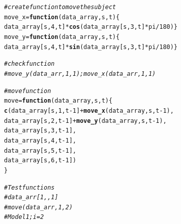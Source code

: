 \documentclass{article}\usepackage[]{graphicx}\usepackage[]{color}
\makeatletter
\newcommand{\hlnum}[1]{\textcolor[rgb]{0.686,0.059,0.569}{#1}}%
\newcommand{\hlcom}[1]{\textcolor[rgb]{0.678,0.584,0.686}{\textit{#1}}}%
\newcommand{\hlopt}[1]{\textcolor[rgb]{0,0,0}{#1}}%
\newcommand{\hlstd}[1]{\textcolor[rgb]{0.345,0.345,0.345}{#1}}%
\newcommand{\hlkwa}[1]{\textcolor[rgb]{0.161,0.373,0.58}{\textbf{#1}}}%
\newcommand{\hlkwb}[1]{\textcolor[rgb]{0.69,0.353,0.396}{#1}}%
\newcommand{\hlkwc}[1]{\textcolor[rgb]{0.333,0.667,0.333}{#1}}%
\newcommand{\hlkwd}[1]{\textcolor[rgb]{0.737,0.353,0.396}{\textbf{#1}}}%
\newenvironment{kframe}{%
 \def\at@end@of@kframe{}%
 \ifinner\ifhmode%
  \def\at@end@of@kframe{\end{minipage}}%
  \begin{minipage}{\columnwidth}%
 \fi\fi%
 \def\FrameCommand##1{\hskip\@totalleftmargin \hskip-\fboxsep
 \colorbox{shadecolor}{##1}\hskip-\fboxsep
     \hskip-\linewidth \hskip-\@totalleftmargin \hskip\columnwidth}%
 \MakeFramed {\advance\hsize-\width
   \@totalleftmargin\z@ \linewidth\hsize
   \@setminipage}}%
 {\par\unskip\endMakeFramed%
 \at@end@of@kframe}
\newenvironment{knitrout}{}{} %
\makeatother
\begin{document}
\begin{knitrout}
\color{fgcolor}\begin{kframe}
\begin{alltt}
\hlcom{#create function to move the subject}
\hlstd{move_x} \hlkwb{=} \hlkwa{function}\hlstd{(}\hlkwc{data_array}\hlstd{,} \hlkwc{s}\hlstd{,} \hlkwc{t}\hlstd{)\{}
\hlstd{data_array[s,} \hlnum{4}\hlstd{, t]} \hlopt{*} \hlkwd{cos}\hlstd{(data_array[s,}\hlnum{3}\hlstd{, t]}\hlopt{*}\hlstd{pi}\hlopt{/}\hlnum{180}\hlstd{)\}}
\hlstd{move_y} \hlkwb{=} \hlkwa{function}\hlstd{(}\hlkwc{data_array}\hlstd{,} \hlkwc{s}\hlstd{,} \hlkwc{t}\hlstd{)\{}
\hlstd{data_array[s,} \hlnum{4}\hlstd{, t]} \hlopt{*} \hlkwd{sin}\hlstd{(data_array[s,}\hlnum{3}\hlstd{, t]}\hlopt{*}\hlstd{pi}\hlopt{/}\hlnum{180}\hlstd{)\}}

\hlcom{# check function }
\hlcom{# move_y(data_arr, 1, 1); move_x(data_arr, 1,1)}

\hlcom{# move function}
\hlstd{move} \hlkwb{=} \hlkwa{function}\hlstd{(}\hlkwc{data_array}\hlstd{,} \hlkwc{s}\hlstd{,} \hlkwc{t}\hlstd{)\{}
  \hlkwd{c}\hlstd{(data_array[s,} \hlnum{1}\hlstd{, t}\hlopt{-}\hlnum{1}\hlstd{]}\hlopt{+} \hlkwd{move_x}\hlstd{(data_array, s, t}\hlopt{-}\hlnum{1}\hlstd{),}
    \hlstd{data_array[s,} \hlnum{2}\hlstd{, t}\hlopt{-}\hlnum{1}\hlstd{]}\hlopt{+} \hlkwd{move_y}\hlstd{(data_array, s, t}\hlopt{-}\hlnum{1}\hlstd{),}
    \hlstd{data_array[s,} \hlnum{3}\hlstd{, t}\hlopt{-}\hlnum{1}\hlstd{],}
    \hlstd{data_array[s,} \hlnum{4}\hlstd{, t}\hlopt{-}\hlnum{1}\hlstd{],}
    \hlstd{data_array[s,} \hlnum{5}\hlstd{, t}\hlopt{-}\hlnum{1}\hlstd{],}
    \hlstd{data_array[s,} \hlnum{6}\hlstd{, t}\hlopt{-}\hlnum{1}\hlstd{])}
\hlstd{\}}

\hlcom{# Test functions}
\hlcom{# data_arr[1,,1]}
\hlcom{# move(data_arr, 1, 2)}
\hlcom{# Model1; i = 2}
\end{alltt}
\end{kframe}
\end{knitrout}
\end{document}
